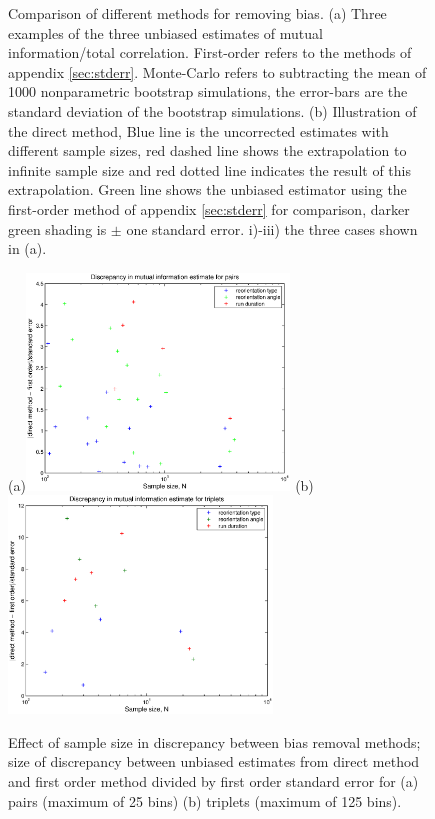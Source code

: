 \documentclass[12pt]{article}
\begin{document}
\begin{figure}
  \caption[Comparison of different methods for removing bias.]{Comparison of different methods for removing bias. (a) Three examples of the three unbiased estimates of mutual information/total correlation. First-order refers to the methods of appendix \ref{sec:stderr}. Monte-Carlo refers to subtracting the mean of 1000 nonparametric bootstrap simulations, the error-bars are the standard deviation of the bootstrap simulations. (b) Illustration of the direct method, Blue line is the uncorrected estimates with different sample sizes, red dashed line shows the extrapolation to infinite sample size and red dotted line indicates the result of this extrapolation. Green line shows the unbiased estimator using the first-order method of appendix \ref{sec:stderr} for comparison, darker green shading is $\pm$ one standard error. i)-iii) the three cases shown in (a).} \label{fig:biascomp}
\end{figure}

\begin{figure}
  \begin{center}
    (a)\includegraphics[width=7cm]{discpair.eps}
    (b)\includegraphics[width=7cm]{disctrip.eps}
  \end{center}
  \caption[Effect of sample size in discrepancy between bias removal methods.]{Effect of sample size in discrepancy between bias removal methods; size of discrepancy between unbiased estimates from direct method and first order method divided by first order standard error for (a) pairs (maximum of 25 bins) (b) triplets (maximum of 125 bins).} \label{fig:discrep}
\end{figure}
\end{document}
